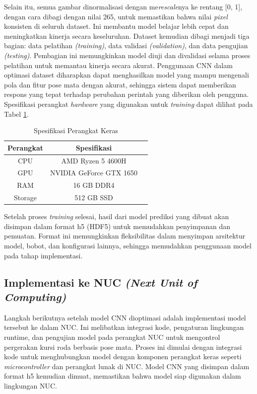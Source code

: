 Selain itu, semua gambar dinormalisasi dengan me\emph{rescale}nya ke rentang [0, 1], dengan cara dibagi dengan nilai 265, untuk memastikan bahwa nilai \emph{pixel} konsisten di seluruh dataset. Ini membantu model belajar lebih cepat dan meningkatkan kinerja secara keseluruhan. Dataset kemudian dibagi menjadi tiga bagian: data pelatihan \emph{(training)}, data validasi \emph{(validation)}, dan data pengujian \emph{(testing)}. Pembagian ini memungkinkan model diuji dan divalidasi selama proses pelatihan untuk memantau kinerja secara akurat. Penggunaan CNN dalam optimasi dataset diharapkan dapat menghasilkan model yang mampu mengenali pola dan fitur pose mata dengan akurat, sehingga sistem dapat memberikan respons yang tepat terhadap perubahan perintah yang diberikan oleh pengguna. Spesifikasi perangkat \emph{hardware} yang digunakan untuk \emph{training} dapat dilihat pada Tabel \ref{tb:speklaptop}.

\begin{longtable}{|c|c|c|}
  \caption{Spesifikasi Perangkat Keras}
  \label{tb:speklaptop} \\
  \hline
  \rowcolor[HTML]{C0C0C0}
  \textbf{Perangkat}        & \textbf{Spesifikasi}    \\ \hline
  \multicolumn{1}{|c|}{CPU} & AMD Ryzen 5 4600H       \\ \hline
  \multicolumn{1}{|c|}{GPU} & NVIDIA GeForce GTX 1650 \\ \hline
  RAM                       & 16 GB DDR4              \\ \hline
  Storage                   & 512 GB SSD              \\ \hline
\end{longtable}

Setelah proses \emph{training} selesai, hasil dari model prediksi yang dibuat akan disimpan dalam format h5 (HDF5) untuk memudahkan penyimpanan dan pemuatan. Format ini memungkinkan fleksibilitas dalam menyimpan arsitektur model, bobot, dan konfigurasi lainnya, sehingga memudahkan penggunaan model pada tahap implementasi.

\subsection{Implementasi ke NUC \textit{(Next Unit of Computing)}}

Langkah berikutnya setelah model CNN dioptimasi adalah implementasi model tersebut ke dalam NUC. Ini melibatkan integrasi kode, pengaturan lingkungan runtime, dan pengujian model pada perangkat NUC untuk mengontrol pergerakan kursi roda berbasis pose mata. Proses ini dimulai dengan integrasi kode untuk menghubungkan model dengan komponen perangkat keras seperti \emph{microcontroller} dan perangkat lunak di NUC. Model CNN yang disimpan dalam format h5 kemudian dimuat, memastikan bahwa model siap digunakan dalam lingkungan NUC.

